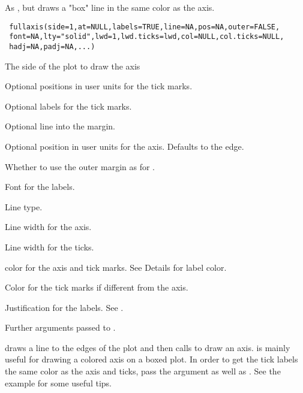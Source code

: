 \begin{Description}\relax
As , but draws a "box" line in the same color as the axis.
\end{Description}
\begin{Usage}
\begin{verbatim}
 fullaxis(side=1,at=NULL,labels=TRUE,line=NA,pos=NA,outer=FALSE,
 font=NA,lty="solid",lwd=1,lwd.ticks=lwd,col=NULL,col.ticks=NULL,
 hadj=NA,padj=NA,...)
\end{verbatim}
\end{Usage}
\begin{Arguments}
\begin{ldescription}
\item[\code{side}] The side of the plot to draw the axis
\item[\code{at}] Optional positions in user units for the tick marks.
\item[\code{labels}] Optional labels for the tick marks.
\item[\code{line}] Optional line into the margin.
\item[\code{pos}] Optional position in user units for the axis. Defaults to the edge.
\item[\code{outer}] Whether to use the outer margin as for .
\item[\code{font}] Font for the labels.
\item[\code{lty}] Line type.
\item[\code{lwd}] Line width for the axis.
\item[\code{lwd.ticks}] Line width for the ticks.
\item[\code{col}] color for the axis and tick marks. See Details for label color.
\item[\code{col.ticks}] Color for the tick marks if different from the axis.
\item[\code{hadj,padj}] Justification for the labels. See .
\item[\code{...}] Further arguments passed to .
\end{ldescription}
\end{Arguments}
\begin{Details}\relax
{} draws a line to the edges of the plot and then calls
 to draw an axis.  is mainly useful for drawing a
colored axis on a boxed plot. In order to get the tick labels the same color as
the axis and ticks, pass the  argument as well as .
See the example for some useful tips.
\end{Details}
